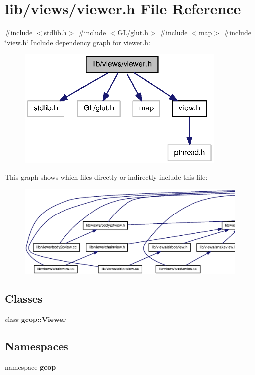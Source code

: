 \section{lib/views/viewer.h \-File \-Reference}
\label{viewer_8h}
{\ttfamily \#include $<$stdlib.\-h$>$}\*
{\ttfamily \#include $<$\-G\-L/glut.\-h$>$}\*
{\ttfamily \#include $<$map$>$}\*
{\ttfamily \#include \char`\"{}view.\-h\char`\"{}}\*
\-Include dependency graph for viewer.\-h\-:
\nopagebreak
\begin{figure}[H]
\begin{center}
\leavevmode
\includegraphics[width=286pt]{viewer_8h__incl}
\end{center}
\end{figure}
\-This graph shows which files directly or indirectly include this file\-:
\nopagebreak
\begin{figure}[H]
\begin{center}
\leavevmode
\includegraphics[width=350pt]{viewer_8h__dep__incl}
\end{center}
\end{figure}
\subsection*{\-Classes}
\begin{DoxyCompactItemize}
\item 
class {\bf gcop\-::\-Viewer}
\end{DoxyCompactItemize}
\subsection*{\-Namespaces}
\begin{DoxyCompactItemize}
\item 
namespace {\bf gcop}
\end{DoxyCompactItemize}
